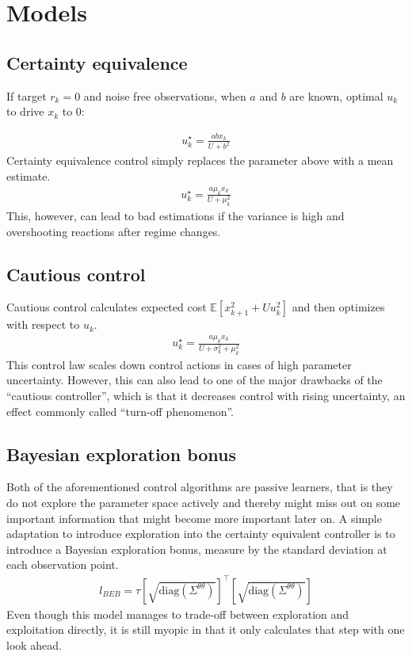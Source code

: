 \documentclass[10pt,letterpaper]{article}
\begin{document}
\section{Models}
\subsection{Certainty equivalence}
If target $r_k=0$ and noise free observations, when $a$ and $b$ are known, optimal $u_k$ to drive $x_k$ to 0:

\begin{align*}
u_k^\star=\frac{abx_k}{U+b^2}
\end{align*}
Certainty equivalence control simply replaces the parameter above with a mean estimate. 
\begin{align*}
u_k^\star=\frac{a\mu_kx_k}{U+\mu_k^2}
\end{align*}
This, however, can lead to bad estimations if the variance is high and overshooting reactions after regime changes.
\subsection{Cautious control}
Cautious control  calculates expected cost $\mathbb{E}[x_{k+1}^2+Uu_k^2]$ and then optimizes with respect to $u_k$.
\begin{align*}
u_k^\star=\frac{a\mu_kx_k}{U+\sigma_k^2+\mu_k^2}
\end{align*}
This control law scales down control actions in cases of high parameter uncertainty. However, this can also lead to one of the major drawbacks of the ``cautious controller'', which is that it decreases control with rising uncertainty, an effect commonly called ``turn-off phenomenon''. 

\subsection{Bayesian exploration bonus}
Both of the aforementioned control algorithms are passive learners, that is they do not explore the parameter space actively and thereby might miss out on some important information that might become more important later on. 
A simple adaptation to introduce exploration into the certainty equivalent controller is to introduce a Bayesian exploration bonus, measure by the standard deviation at each observation point.
\begin{align*}
l_{BEB}=\tau\left[\sqrt{\text{diag}(\Sigma^{\theta\theta})} \right]^\top \left[\sqrt{\text{diag}(\Sigma^{\theta\theta})} \right]
\end{align*}
Even though this model manages to trade-off between exploration and exploitation directly, it is still myopic in that it only calculates that step with one look ahead.
\end{document}
